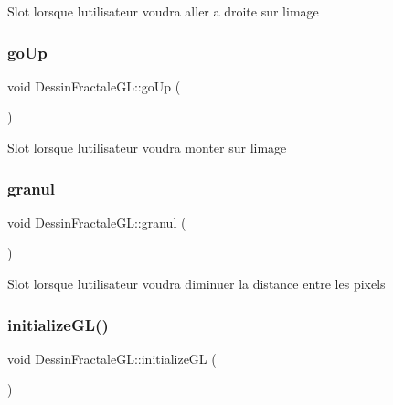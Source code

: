 Slot lorsque l\textquotesingle{}utilisateur voudra aller a droite sur l\textquotesingle{}image \mbox{\label{classDessinFractaleGL_a0bffca09a6c44bbcc7e4ee7e5d7357fb}} 
\subsubsection{\texorpdfstring{go\+Up}{goUp}}
{\footnotesize\ttfamily void Dessin\+Fractale\+G\+L\+::go\+Up (\begin{DoxyParamCaption}{ }\end{DoxyParamCaption})\hspace{0.3cm}{\ttfamily [slot]}}

Slot lorsque l\textquotesingle{}utilisateur voudra monter sur l\textquotesingle{}image \mbox{\label{classDessinFractaleGL_ae05d9f2b35e02a5e71ff0a58b382d121}} 
\subsubsection{\texorpdfstring{granul}{granul}}
{\footnotesize\ttfamily void Dessin\+Fractale\+G\+L\+::granul (\begin{DoxyParamCaption}{ }\end{DoxyParamCaption})\hspace{0.3cm}{\ttfamily [slot]}}

Slot lorsque l\textquotesingle{}utilisateur voudra diminuer la distance entre les pixels \mbox{\label{classDessinFractaleGL_a9ad221cef5dcba79ba0a3105da2c81fd}} 
\subsubsection{\texorpdfstring{initialize\+G\+L()}{initializeGL()}}
{\footnotesize\ttfamily void Dessin\+Fractale\+G\+L\+::initialize\+GL (\begin{DoxyParamCaption}{ }\end{DoxyParamCaption})}

